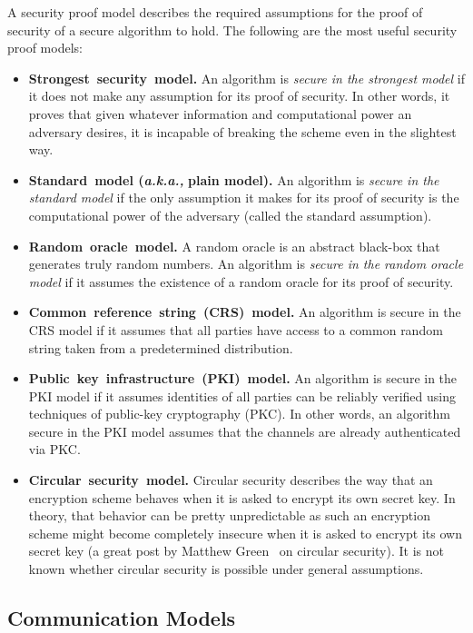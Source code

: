 \documentclass[11pt]{article}
\theoremstyle{plain}
\begin{document}
A security proof model describes the required assumptions for the
proof of security of a secure algorithm to hold. The following are
the most useful security proof models:
\begin{itemize}
	\item \textbf{Strongest~security~model.} An algorithm is \emph{secure
		in the strongest model} if it does not make any assumption for its
	proof of security. In other words, it proves that given whatever information
	and computational power an adversary desires, it is incapable of breaking
	the scheme even in the slightest way.
	\item \textbf{Standard~model (}\textbf{\emph{a.k.a.,}}\textbf{ plain model).}
	An algorithm is \emph{secure in the standard model} if the only assumption
	it makes for its proof of security is the computational power of the
	adversary (called the standard assumption).
	\item \textbf{Random~oracle~model.} A random oracle is an abstract black-box
	that generates truly random numbers. An algorithm is \emph{secure
		in the random oracle model} if it assumes the existence of a random
	oracle for its proof of security.
	\item \textbf{Common~reference~string~(CRS)~model.} An algorithm is
	secure in the CRS model if it assumes that all parties have access
	to a common random string taken from a predetermined distribution.
	\item \textbf{Public~key~infrastructure~(PKI)~model.} An algorithm is
	secure in the PKI model if it assumes identities of all parties can
	be reliably verified using techniques of public-key cryptography (PKC).
	In other words, an algorithm secure in the PKI model assumes that
	the channels are already authenticated via PKC.
	\item \textbf{Circular~security~model.} Circular security describes the
	way that an encryption scheme behaves when it is asked to encrypt
	its own secret key. In theory, that behavior can be pretty unpredictable
	as such an encryption scheme might become completely insecure when
	it is asked to encrypt its own secret key (a great post by Matthew
	Green~\cite{green:2012:circular:security} on circular security).
	It is not known whether circular security is possible under general
	assumptions.
\end{itemize}

\subsection{Communication Models}
\end{document}
